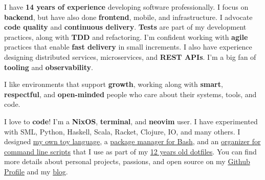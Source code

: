 \documentclass[10pt,a4paper,ragged2e,withhyper]{altacv}
\begin{document}
\begin{paracol}{2}
%

%
%
%




I have \textbf{14 years of experience} developing software professionally. I focus on \textbf{backend}, but have also done \textbf{frontend}, mobile, and infrastructure. I advocate \textbf{code quality} and \textbf{continuous delivery}. \textbf{Tests} are part of my development practices, along with \textbf{TDD} and refactoring. I’m confident working with \textbf{agile} practices that enable \textbf{fast delivery} in small increments. I also have experience designing distributed services, microservices, and \textbf{REST APIs}. I'm a big fan of \textbf{tooling} and \textbf{observability}.

\begingroup
\setlength{\parskip}{1em}

I like environments that support \textbf{growth}, working along with \textbf{smart}, \textbf{respectful}, and \textbf{open-minded} people who care about their systems, tools, and code.

I love to \textbf{code}! I'm a \textbf{NixOS}, \textbf{terminal}, and \textbf{neovim} user. I have experimented with SML, Python, Haskell, Scala, Racket, Clojure, IO, and many others. I designed \href{https://github.com/juanibiapina/marco}{my own toy language}, a \href{https://github.com/basherpm/basher}{package manager for Bash}, and an \href{https://github.com/juanibiapina/sub}{organizer for command line scripts} that I use as part of my \href{https://github.com/juanibiapina/dotfiles}{12 years old dotfiles}. You can find more details about personal projects, passions, and open source on my \href{https://github.com/juanibiapina/}{Github Profile} and my \href{https://juanibiapina.github.io/}{blog}.


\end{paracol}
\end{document}

